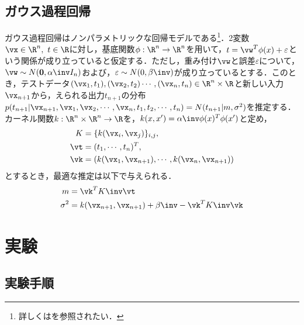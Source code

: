 \documentclass[JEL]{AEA}
\begin{document}
\subsection{ガウス過程回帰}
ガウス過程回帰はノンパラメトリックな回帰モデルである\footnote{詳しくは\cite{bishop}を参照されたい．}．2変数$\vx\in\R^n,\ t\in\R$に対し，基底関数$\phi:\R^n\to\R^n$を用いて，$t=\vw^T\phi(x)+\varepsilon$という関係が成り立っていると仮定する．ただし，重み付け$\vw$と誤差$\varepsilon$について，$\vw\sim N({\bm 0},\alpha\inv I_n)$および，$\varepsilon \sim N(0,\beta\inv)$が成り立っているとする．このとき，テストデータ$(\vx_1,t_1),(\vx_2,t_2)\cdots,(\vx_n,t_n)\in\R^n\times \R$と新しい入力$\vx_{n+1}$から，えられる出力$t_{n+1}$の分布$p(t_{n+1}|\vx_{n+1},\vx_1,\vx_2,\cdots,\vx_n,t_1,t_2,\cdots,t_n)=N(t_{n+1}|m,\sigma^2)$を推定する．
カーネル関数$k:\R^n\times\R^n\to\R$を，$k(x,x')=\alpha\inv\phi(x)^T\phi(x')$と定め，
\begin{align*}
 K&=\{k(\vx_i,\vx_j)\}_{i,j},\\
 \vt&=(t_1,\cdots,t_n)^T,\\
 \vk&=(k(\vx_1,\vx_{n+1}),\cdots,k(\vx_n,\vx_{n+1}))
\end{align*}
とするとき，最適な推定は以下で与えられる．
\begin{align*}
 m&=\vk^T K\inv \vt\\
 \sigma^2&=k(\vx_{n+1},\vx_{n+1})+\beta\inv-\vk^TK\inv \vk
\end{align*}

\section{実験}
\subsection{実験手順}
\end{document}
